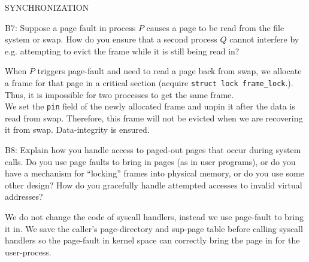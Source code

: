 \begin{aspect}{SYNCHRONIZATION}
	\begin{qc}
		B7: Suppose a page fault in process $P$ causes a page to be read from the file system or swap.
		How do you ensure that a second process $Q$ cannot interfere
		by e.g. attempting to evict the frame while it is still being read in?
	\end{qc}
	When $P$ triggers page-fault and need to read a page back from swap,
	we allocate a frame for that page in a critical section (acquire \lstinline{struct lock frame_lock}.).
	Thus, it is impossible for two processes to get the same frame.\\

	We set the \lstinline{pin} field of the newly allocated frame and unpin it after the data is read from swap.
	Therefore, this frame will not be evicted when we are recovering it from swap. Data-integrity is ensured.

	\begin{qc}
		B8: Explain how you handle access to paged-out pages that occur during system calls.
		Do you use page faults to bring in pages (as in user programs),
		or do you have a mechanism for ``locking'' frames into physical memory,
		or do you use some other design?
		How do you gracefully handle attempted accesses to invalid virtual addresses?
	\end{qc}

	We do not change the code of syscall handlers, instead we use page-fault to bring it in.
	We save the caller's page-directory and sup-page table before calling syscall handlers so
	the page-fault in kernel space can correctly bring the page in for the user-process.
\end{aspect}


